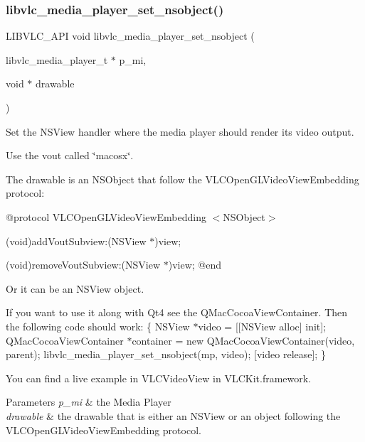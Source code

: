 \subsubsection{\texorpdfstring{libvlc\+\_\+media\+\_\+player\+\_\+set\+\_\+nsobject()}{libvlc\_media\_player\_set\_nsobject()}}
{\footnotesize\ttfamily L\+I\+B\+V\+L\+C\+\_\+\+A\+PI void libvlc\+\_\+media\+\_\+player\+\_\+set\+\_\+nsobject (\begin{DoxyParamCaption}\item[{libvlc\+\_\+media\+\_\+player\+\_\+t $\ast$}]{p\+\_\+mi,  }\item[{void $\ast$}]{drawable }\end{DoxyParamCaption})}

Set the N\+S\+View handler where the media player should render its video output.

Use the vout called \char`\"{}macosx\char`\"{}.

The drawable is an N\+S\+Object that follow the V\+L\+C\+Open\+G\+L\+Video\+View\+Embedding protocol\+:

@protocol V\+L\+C\+Open\+G\+L\+Video\+View\+Embedding $<$\+N\+S\+Object$>$
\begin{DoxyItemize}
\item (void)add\+Vout\+Subview\+:(\+N\+S\+View $\ast$)view;
\item (void)remove\+Vout\+Subview\+:(\+N\+S\+View $\ast$)view; @end 
\end{DoxyItemize}

Or it can be an N\+S\+View object.

If you want to use it along with Qt4 see the Q\+Mac\+Cocoa\+View\+Container. Then the following code should work\+:  \{ N\+S\+View $\ast$video = \mbox{[}\mbox{[}N\+S\+View alloc\mbox{]} init\mbox{]}; Q\+Mac\+Cocoa\+View\+Container $\ast$container = new Q\+Mac\+Cocoa\+View\+Container(video, parent); libvlc\+\_\+media\+\_\+player\+\_\+set\+\_\+nsobject(mp, video); \mbox{[}video release\mbox{]}; \} 

You can find a live example in V\+L\+C\+Video\+View in V\+L\+C\+Kit.\+framework.


\begin{DoxyParams}{Parameters}
{\em p\+\_\+mi} & the Media Player \\
\hline
{\em drawable} & the drawable that is either an N\+S\+View or an object following the V\+L\+C\+Open\+G\+L\+Video\+View\+Embedding protocol. \\
\hline
\end{DoxyParams}
\mbox{\label{group__libvlc__media__player_ga6e39882b33a22337cec9fd49dd7e23c4}} 
